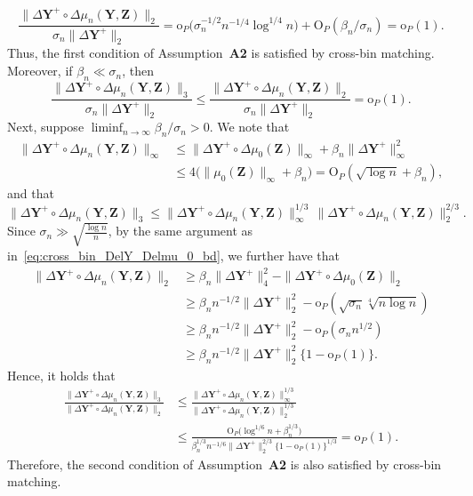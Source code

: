 \documentclass[12pt]{article}
\newcommand{\bY}{\mathbf{Y}}
\newcommand{\bZ}{\mathbf{Z}}
\begin{document}
    \[
    \frac{\|\Delta\bY^+\circ \Delta\mu_n(\bY,\bZ)\|_2}{\sigma_n\|\Delta\bY^+\|_2}=\mathrm{o}_P\bigl(\sigma_n^{-1/2}n^{-1/4} \log^{1/4} n\bigr)+\mathrm{O}_P(\beta_n/\sigma_n)=\mathrm{o}_P(1).
    \]
    Thus, the first condition of Assumption~\textbf{A2} is satisfied by cross-bin matching. Moreover, if $\beta_n\ll\sigma_n$, then
    \[
    \frac{\|\Delta\bY^+\circ \Delta\mu_n(\bY,\bZ)\|_3}{\sigma_n\|\Delta\bY^+\|_2} \leq \frac{\|\Delta\bY^+\circ \Delta\mu_n(\bY,\bZ)\|_2}{\sigma_n\|\Delta\bY^+\|_2} =\mathrm{o}_P(1).
    \]
    Next, suppose $\liminf_{n\to\infty} \beta_n/\sigma_n>0$. We note that 
    \begin{align*}
        \|\Delta\bY^+\circ \Delta\mu_n(\bY,\bZ)\|_\infty&\leq \|\Delta\bY^+\circ \Delta\mu_0(\bZ)\|_\infty +\beta_n \|\Delta\bY^+\|_\infty^2\\
        &\leq 4\bigl( \|\mu_0(\bZ)\|_\infty+\beta_n\bigr) = \mathrm{O}_P(\sqrt{\log n}+\beta_n),
    \end{align*}
    and that 
    \[
    \|\Delta\bY^+\circ \Delta\mu_n(\bY,\bZ)\|_3 
    \leq \|\Delta\bY^+\circ \Delta\mu_n(\bY,\bZ)\|_\infty^{1/3}\,\|\Delta\bY^+\circ \Delta\mu_n(\bY,\bZ)\|_2^{2/3}.
    \]
    Since $\sigma_n\gg \sqrt{\frac{\log n}{n}}$, by the same argument as in~\eqref{eq:cross_bin_DelY_Delmu_0_bd}, we further have that
    \begin{align*}
        \|\Delta\bY^+\circ \Delta\mu_n(\bY,\bZ)\|_2&\geq \beta_n\|\Delta\bY^+\|_4^2-\|\Delta\bY^+\circ \Delta\mu_0(\bZ)\|_2\\
        &\ge \beta_n n^{-1/2} \|\Delta\bY^+\|_2^2-
        \mathrm{o}_P(\sqrt{\sigma_n}\sqrt[4]{n\log n})\\
        &\ge \beta_n n^{-1/2} \|\Delta\bY^+\|_2^2-
        \mathrm{o}_P(\sigma_n n^{1/2})\\
        &\ge \beta_n n^{-1/2} \|\Delta\bY^+\|_2^2\{1 - \mathrm{o}_P(1)\}.
    \end{align*}
    Hence, it holds that 
    \begin{align*}
    \frac{\|\Delta\bY^+\circ \Delta\mu_n(\bY,\bZ)\|_3}{\|\Delta\bY^+\circ \Delta\mu_n(\bY,\bZ)\|_2}&\le \frac{\|\Delta\bY^+\circ \Delta\mu_n(\bY,\bZ)\|_\infty^{1/3}}{\|\Delta\bY^+\circ \Delta\mu_n(\bY,\bZ)\|_2^{1/3}} \\&\le \frac{ \mathrm{O}_P\bigl(\log^{1/6} n +\beta_n^{1/3}\bigr)}{\beta_n^{1/3} n^{-1/6} \|\Delta\bY^+\|_2^{2/3}\{1 - \mathrm{o}_P(1)\}^{1/3}}
    = \mathrm{o}_P(1).
    \end{align*}
    Therefore, the second condition of Assumption~\textbf{A2} is also satisfied by cross-bin matching. 
    
\end{document}
